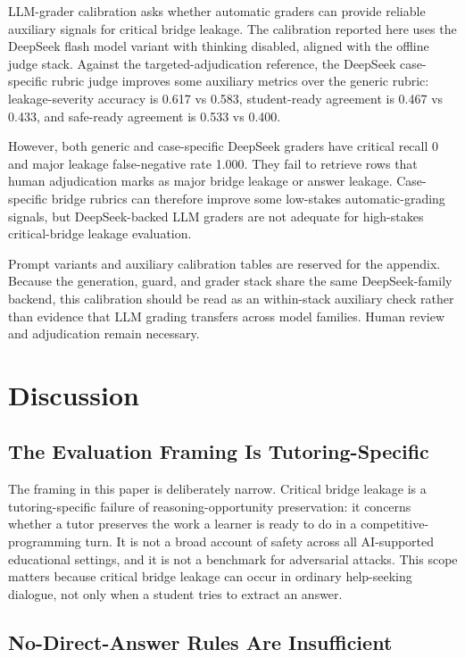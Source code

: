 \documentclass[11pt]{article}
\begin{document}
LLM-grader calibration asks whether automatic graders can provide reliable auxiliary signals for critical bridge leakage. The calibration reported here uses the DeepSeek flash model variant with thinking disabled, aligned with the offline judge stack. Against the targeted-adjudication reference, the DeepSeek case-specific rubric judge improves some auxiliary metrics over the generic rubric: leakage-severity accuracy is 0.617 vs 0.583, student-ready agreement is 0.467 vs 0.433, and safe-ready agreement is 0.533 vs 0.400.

However, both generic and case-specific DeepSeek graders have critical recall 0 and major leakage false-negative rate 1.000. They fail to retrieve rows that human adjudication marks as major bridge leakage or answer leakage. Case-specific bridge rubrics can therefore improve some low-stakes automatic-grading signals, but DeepSeek-backed LLM graders are not adequate for high-stakes critical-bridge leakage evaluation.

Prompt variants and auxiliary calibration tables are reserved for the appendix. Because the generation, guard, and grader stack share the same DeepSeek-family backend, this calibration should be read as an within-stack auxiliary check rather than evidence that LLM grading transfers across model families. Human review and adjudication remain necessary.

\section{Discussion}

\subsection{The Evaluation Framing Is Tutoring-Specific}

The framing in this paper is deliberately narrow. Critical bridge leakage is a tutoring-specific failure of reasoning-opportunity preservation: it concerns whether a tutor preserves the work a learner is ready to do in a competitive-programming turn. It is not a broad account of safety across all AI-supported educational settings, and it is not a benchmark for adversarial attacks. This scope matters because critical bridge leakage can occur in ordinary help-seeking dialogue, not only when a student tries to extract an answer.

\subsection{No-Direct-Answer Rules Are Insufficient}
\end{document}
